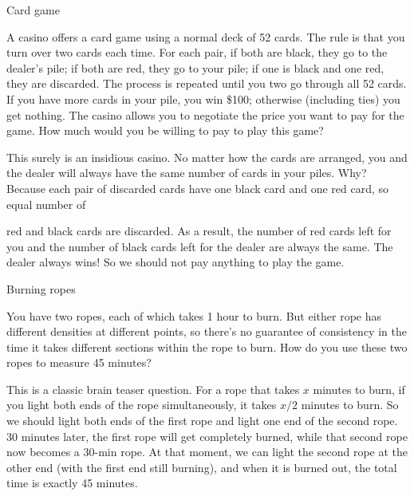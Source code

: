 \begin{problem}{Card game}

A casino offers a card game using a normal deck of 52 cards. The rule is that you turn over
two cards each time. For each pair, if both are black, they go to the dealer's pile; if both are
red, they go to your pile; if one is black and one red, they are discarded. The process is
repeated until you two go through all 52 cards. If you have more cards in your pile, you win
\$100; otherwise (including ties) you get nothing. The casino allows you to negotiate the
price you want to pay for the game. How much would you be willing to pay to play this
game?\footnotemark[2]
\end{problem}

\begin{solution}
This surely is an insidious casino. No matter how the cards are arranged, you and the dealer
will always have the same number of cards in your piles. Why? Because each pair of
discarded cards have one black card and one red card, so equal number of

red and black cards are discarded. As a result, the number of red cards left for you and
the number of black cards left for the dealer are always the same. The dealer always wins!
So we should not pay anything to play the game.
\end{solution}

\begin{problem}{Burning ropes}

You have two ropes, each of which takes 1 hour to burn. But either rope has different
densities at different points, so there's no guarantee of consistency in the time it takes
different sections within the rope to burn. How do you use these two ropes to measure 45
minutes?
\end{problem}

\begin{solution}
This is a classic brain teaser question. For a rope that takes $x$ minutes to burn, if you
light both ends of the rope simultaneously, it takes $x/2$ minutes to burn. So we should
light both ends of the first rope and light one end of the second rope. 30 minutes later, the
first rope will get completely burned, while that second rope now becomes a 30-min rope.
At that moment, we can light the second rope at the other end (with the first end still
burning), and when it is burned out, the total time is exactly 45 minutes.
\end{solution}

